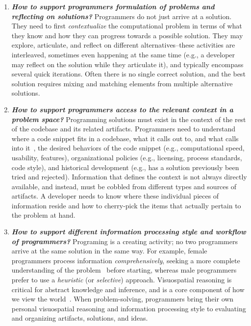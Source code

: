 \begin{enumerate}[label=C\arabic*.]
	\item \textit{\textbf{How to support programmers formulation of problems and reflecting on solutions?}}
	Programmers do not just arrive at a solution.
	They need to first \textit{contextualize} the computational problem in terms of what they know and how they can progress towards a possible solution.
	They may explore, articulate, and reflect on different alternatives--these activities are interleaved, sometimes even happening at the same time (e.g., a developer may reflect on the solution while they articulate it), and typically encompass several quick iterations.
	Often there is no single correct solution, and the best solution requires mixing and matching elements from multiple alternative solutions.
    
    \item \textit{\textbf{How to support programmers access to the relevant context in a problem space?}}
    Programming solutions must exist in the context of the rest of the codebase and its related artifacts.
    Programmers need to understand where a code snippet fits in a codebase, what it calls out to, and what calls into it~\cite{desouza2008empirical}, the desired behaviors of the code snippet (e.g., computational speed, usability, features), organizational policies (e.g., licensing, process standards, code style), and historical development (e.g., has a solution previously been tried and rejected).
    Information that defines the context is not always directly available, and instead, must be cobbled from different types and sources of artifacts.
    A developer needs to know where these individual pieces of information reside and how to cherry-pick the items that actually pertain to the problem at hand.
    
 	\item \textit{\textbf{How to support different information processing style and workflow of programmers?}}
 	Programing is a creating activity; no two programmers arrive at the same solution in the same way. For example, female programmers process information \textit{comprehensively}, seeking a more complete understanding of the problem~\cite{grigoreanu2012end} before starting, whereas male programmers prefer to use a \textit{heuristic} (or \textit{selective}) approach. 
 	Visuospatial reasoning is critical for abstract knowledge and inference, and is a core component of how we view the world~\cite{tversky2005visuospatial}.
 	When problem-solving, programmers bring their own personal visuospatial reasoning and information processing style to evaluating and organizing artifacts, solutions, and ideas.
  

\end{enumerate}

